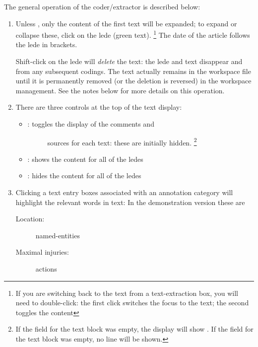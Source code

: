 \documentclass[letterpaper,10pt,english]{sphinxmanual}
\begin{document}
The general operation of the coder/extractor is described below:
\begin{enumerate}
\item {} 
Unless , only the content
of the first text will be expanded; to expand or collapse these,
click on the lede (green text). \footnote{
If you are switching back to the text from a text-extraction box,
you will need to double-click: the first click switches the focus
to the text; the second toggles the content
} The date of the
article follows the lede in brackets.

Shift-click on the lede will \emph{delete} the text: the lede and text
disappear and from any subsequent codings. The text actually remains
in the workspace file until it is permanently removed (or the
deletion is reversed) in the workspace management. See the notes
below for more details on this operation.

\item {} 
There are three controls at the top of the text display:
\begin{itemize}
\item {} \begin{description}
\item[{: toggles the display of the comments and}] \leavevmode
sources for each text: these are initially hidden.  \footnote{
If the  field for the text block was empty, the display will show
. If the  field for the text block was empty,
no  line will be shown.
}

\end{description}

\item {} 
: shows the content for all of the ledes

\item {} 
: hides the content for all of the ledes

\end{itemize}

\item {} 
Clicking a text entry boxes associated with an annotation category
will highlight the relevant words in text: In the demonstration
version these are
\begin{description}
\item[{Location:}] \leavevmode
named-entities

\item[{Maximal injuries:}] \leavevmode
actions


\end{description}
\end{enumerate}
\end{document}
